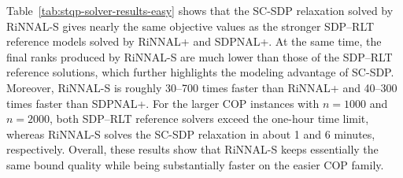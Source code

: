 \documentclass[11pt]{article}
\theoremstyle{plain}
\begin{document}
\normalsize

Table~\ref{tab:stqp-solver-results-easy} shows that the SC-SDP relaxation solved by RiNNAL-S gives nearly the same objective values as the stronger SDP--RLT reference models solved by RiNNAL+ and SDPNAL+. At the same time, the final ranks produced by RiNNAL-S are much lower than those of the SDP--RLT reference solutions, which further highlights the modeling advantage of SC-SDP. Moreover, RiNNAL-S is roughly 30--700 times faster than RiNNAL+ and 40--300 times faster than SDPNAL+. For the larger COP instances with $n=1000$ and $n=2000$, both SDP--RLT reference solvers exceed the one-hour time limit, whereas RiNNAL-S solves the SC-SDP relaxation in about 1 and 6 minutes, respectively. Overall, these results show that RiNNAL-S keeps essentially the same bound quality while being substantially faster on the easier COP family.
\end{document}
